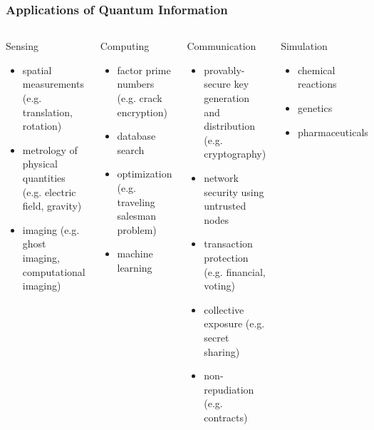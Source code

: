 \begin{frame}
  \frametitle{Applications of Quantum Information}
  \begin{scriptsize}
      \begin{columns}
    \begin{block}{Sensing}
      \begin{itemize}
      \item spatial measurements (e.g. translation, rotation)
      \item metrology of physical quantities (e.g. electric field, gravity)
      \item imaging (e.g. ghost imaging, computational imaging)
      \end{itemize}
    \end{block}
    
    \begin{block}{Computing}
      \begin{itemize}
      \item factor prime numbers (e.g. crack encryption)
      \item database search
      \item optimization (e.g. traveling salesman problem)
      \item machine learning
      \end{itemize}
    \end{block}

    \begin{block}{Communication}
      \begin{itemize}
      \item provably-secure key generation and distribution
        (e.g. cryptography) 
      \item network security using untrusted nodes
      \item transaction protection (e.g. financial, voting)
      \item collective exposure (e.g. secret sharing)
      \item non-repudiation (e.g. contracts)
      \end{itemize}
    \end{block}

    \begin{block}{Simulation}
      \begin{itemize}
      \item chemical reactions
      \item genetics
      \item pharmaceuticals
      \end{itemize}
    \end{block}

    
  \end{columns}
  \end{scriptsize}
\end{frame}